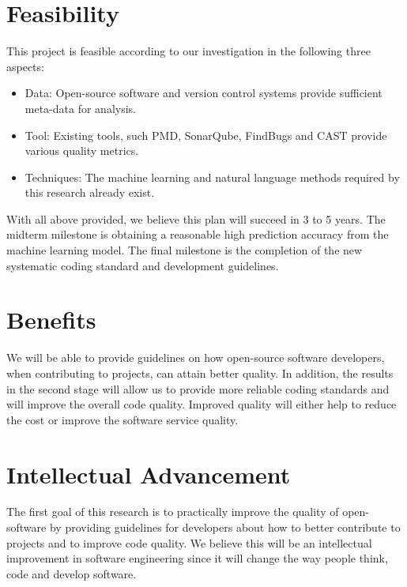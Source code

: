\documentclass[10pt,conference]{IEEEtran}
\begin{document}
\section{Feasibility}
This project is feasible according to our investigation in the following three aspects:
\begin{itemize}
    \item Data: Open-source software and version control systems provide sufficient meta-data for analysis.
    \item Tool: Existing tools, such PMD, SonarQube, FindBugs and CAST provide various quality metrics.
    \item Techniques: The machine learning and natural language methods required by this research already exist.
\end{itemize}
With all above provided, we believe this plan will succeed in 3 to 5 years.
The midterm milestone is obtaining a reasonable high prediction accuracy from the machine learning model.
The final milestone is the completion of the new systematic coding standard and development guidelines.

\section{Benefits}

We will be able to provide guidelines on how open-source software developers, when contributing to projects,  can attain better quality. 
In addition, the results in the second stage will allow us to provide more reliable coding standards and will improve the overall code quality.
Improved quality will either help to reduce the cost or improve the software service quality.

\section{Intellectual Advancement}

The first goal of this research is to practically improve the quality of open-software by providing guidelines for developers about how to better contribute to projects and to improve code quality. 
We believe this will be an intellectual improvement in software engineering since it will change the way people think, code and develop software.

\medskip
%
%

\vspace{12pt}
\color{red}
\end{document}
